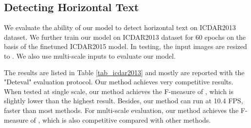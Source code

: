 \documentclass[10pt,twocolumn,letterpaper]{article}
\begin{document}
\subsection{Detecting Horizontal Text}

We evaluate the ability of our model to detect horizontal text on ICDAR2013 dataset. We further train our model on ICDAR2013 dataset for 60 epochs on the basis of the finetuned ICDAR2015 model. In testing, the input images are resized to . We also use multi-scale inputs to evaluate our model.

The  results are listed in Table \ref{tab_icdar2013} and mostly are reported with the "Deteval" evaluation protocol. Our method achieves very competitive results. When tested at single scale, our method achieves the F-measure of , which is slightly lower than the highest result. Besides, our method can run at 10.4 FPS, faster than most methods. For multi-scale evaluation, our method achieves the F-measure of , which is also  competitive compared with other methods.
\end{document}
